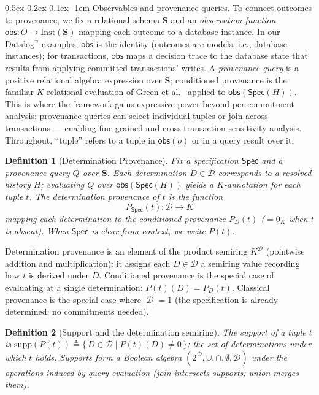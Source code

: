\documentclass[acmsmall,review,anonymous]{acmart}
\makeatletter
\renewcommand{\paragraph}{\@startsection{paragraph}{4}{\z@}%
  {0.5ex \@plus 0.2ex \@minus 0.1ex}%
  {-1em}%
  {\normalfont\normalsize\bfseries}}
\newcommand{\Spec}{\mathsf{Spec}}
\newtheorem{definition}{Definition}
\theoremstyle{remark}
\numberwithin{definition}{section}
\numberwithin{theorem}{section}
\numberwithin{lemma}{section}
\numberwithin{corollary}{section}
\numberwithin{remark}{section}
\numberwithin{example}{section}
\numberwithin{observation}{section}
\numberwithin{assumption}{section}
\makeatother
\begin{document}
\paragraph{Observables and provenance queries.}
To connect outcomes to provenance, we fix a relational schema
$\mathbf{S}$ and an \emph{observation function}
$\mathsf{obs}: O \to \mathrm{Inst}(\mathbf{S})$ mapping each outcome
to a database instance.
In our $\mbox{Datalog}^\neg$ examples, $\mathsf{obs}$ is the identity
(outcomes are models, i.e., database instances); for transactions,
$\mathsf{obs}$ maps a decision trace to the database state that
results from applying committed transactions' writes.
A \emph{provenance query} is a positive relational algebra expression
over $\mathbf{S}$; conditioned provenance is the familiar
$K$-relational evaluation of Green et
al.~\cite{green2007provenance} applied to $\mathsf{obs}(\Spec(H))$.
This is where the framework gains expressive power beyond
per-commitment analysis: provenance queries can select individual
tuples or join across transactions --- enabling fine-grained and
cross-transaction sensitivity analysis.
Throughout, ``tuple'' refers to a tuple in $\mathsf{obs}(o)$ or in a
query result over it.

\begin{definition}[Determination Provenance]
  \label{def:det-provenance}
  Fix a specification $\Spec$ and a provenance query $Q$ over
  $\mathbf{S}$.
  Each determination $D \in \mathcal{D}$ corresponds to a resolved
  history $H$; evaluating $Q$ over $\mathsf{obs}(\Spec(H))$ yields a
  $K$-annotation for each tuple $t$.
  The \emph{determination provenance} of $t$ is the function
  \[
    P_{\Spec}(t) : \mathcal{D} \to K
  \]
  mapping each determination to the conditioned provenance $P_D(t)$
  ($= 0_K$ when $t$ is absent).
  When $\Spec$ is clear from context, we write $P(t)$.
\end{definition}

\noindent
Determination provenance is an element of the product semiring
$K^{\mathcal{D}}$ (pointwise addition and multiplication):
it assigns each $D \in \mathcal{D}$ a semiring value
recording how $t$ is derived under $D$.
Conditioned provenance is the special case of evaluating at a single determination:
$P(t)(D) = P_D(t)$.
Classical provenance is the special case where $|\mathcal{D}| = 1$
(the specification is already determined; no commitments needed).

\begin{definition}[Support and the determination semiring]
  The \emph{support} of a tuple $t$ is
  $\mathrm{supp}(P(t))
    \triangleq
    \{\, D \in \mathcal{D} \mid P(t)(D) \neq 0 \,\}$:
  the set of determinations under which $t$ holds.
  Supports form a Boolean algebra
  $(2^{\mathcal{D}}, \cup, \cap, \emptyset, \mathcal{D})$
  under the operations induced by query evaluation (join intersects
  supports; union merges them).
\end{definition}
\end{document}
